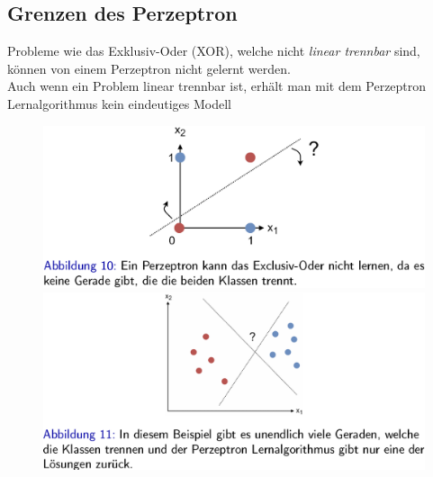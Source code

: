 \documentclass{report}
\begin{document}
\subsection{Grenzen des Perzeptron}
Probleme wie das Exklusiv-Oder (XOR), welche nicht \textit{linear trennbar} sind, können von einem Perzeptron nicht gelernt werden.\\
Auch wenn ein Problem linear trennbar ist, erhält man mit dem Perzeptron Lernalgorithmus kein eindeutiges Modell
\begin{figure}[H]
  \centering
  \begin{minipage}[b]{0.4\textwidth}
    \includegraphics[scale=.25]{ml04_9}
  \end{minipage}
  \hfill
  \begin{minipage}[b]{0.4\textwidth}
    \includegraphics[scale=.25]{ml04_10}
  \end{minipage}
\end{figure}
\end{document}
